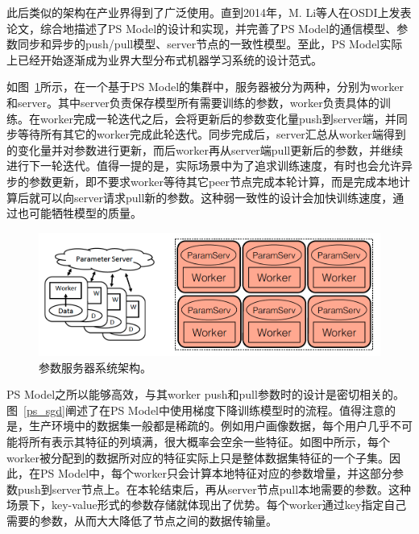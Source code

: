 此后类似的架构在产业界得到了广泛使用。直到2014年，M. Li等人\parencite{186214}在OSDI上发表论文，综合地描述了PS Model的设计和实现，并完善了PS Model的通信模型、参数同步和异步的push/pull模型、server节点的一致性模型。至此，PS Model实际上已经开始逐渐成为业界大型分布式机器学习系统的设计范式。

如图~\ref{ps_arch}所示，在一个基于PS Model的集群中，服务器被分为两种，分别为worker和server。其中server负责保存模型所有需要训练的参数，worker负责具体的训练。在worker完成一轮迭代之后，会将更新后的参数变化量push到server端，并同步等待所有其它的worker完成此轮迭代。同步完成后，server汇总从worker端得到的变化量并对参数进行更新，而后worker再从server端pull更新后的参数，并继续进行下一轮迭代。值得一提的是，实际场景中为了追求训练速度，有时也会允许异步的参数更新，即不要求worker等待其它peer节点完成本轮计算，而是完成本地计算后就可以向server请求pull新的参数。这种弱一致性的设计会加快训练速度，通过也可能牺牲模型的质量。

\begin{figure}[h]
    \centerline{\includegraphics[width=\textwidth]{figures/ps-arch.png}}
    \caption{参数服务器系统架构。}
    \label{ps_arch}
\end{figure}

PS Model之所以能够高效，与其worker push和pull参数时的设计是密切相关的。 图~\ref{ps_sgd}阐述了在PS Model中使用梯度下降训练模型时的流程。值得注意的是，生产环境中的数据集一般都是稀疏的。例如用户画像数据，每个用户几乎不可能将所有表示其特征的列填满，很大概率会空余一些特征。如图中所示，每个worker被分配到的数据所对应的特征实际上只是整体数据集特征的一个子集。因此，在PS Model中，每个worker只会计算本地特征对应的参数增量，并这部分参数push到server节点上。在本轮结束后，再从server节点pull本地需要的参数。这种场景下，key-value形式的参数存储就体现出了优势。每个worker通过key指定自己需要的参数，从而大大降低了节点之间的数据传输量。

